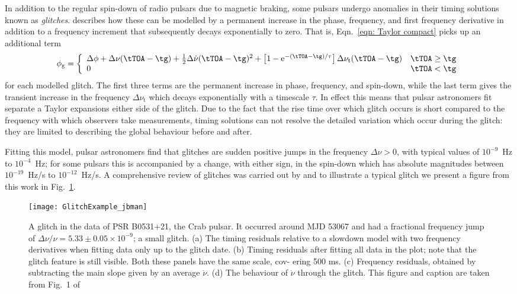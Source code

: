 In addition to the regular spin-down of radio pulsars due to magnetic braking, some
pulsars undergo anomalies in their timing solutions known as \emph{glitches}.
\citet{Edwards2006} describes how these can be modelled by a permanent increase
in the phase, frequency, and first frequency derivative in addition to a
frequency increment that subsequently decays exponentially to zero. That is,
Eqn.~\eqref{eqn: Taylor compact} picks up an additional term
\begin{align}
\phi_{\textrm{g}} = \left\{
\begin{array}{ll}
\Delta\phi + \Delta\nu(\tTOA - \tg) + \frac{1}{2}\Delta\dot{\nu}(\tTOA - \tg)^{2}
+ \left[1-\textrm{e}^{-(\tTOA - \tg)/\tau}\right]\Delta\nu_{\textrm{t}}(\tTOA - \tg)
& \tTOA \ge \tg \\
0 & \tTOA < \tg
\end{array}
\right.
\label{eqn: glitch timing model}
\end{align}
for each modelled glitch. The first three terms are the permanent increase
in phase, frequency, and spin-down, while the last term gives the transient
increase in the frequency $\Delta\nu_{\textrm{t}}$ which decays exponentially
with a timescale $\tau$. In effect this means that pulsar astronomers fit
separate a Taylor expansions either side of the glitch. Due to the fact that
the rise time over which glitch occurs is short compared to the frequency
with which observers take measurements, timing solutions can not resolve the
detailed variation which occur during the glitch: they are limited to describing
the global behaviour before and after.

Fitting this model, pulsar astronomers find that glitches are sudden positive
jumps in the frequency $\Delta\nu > 0$, with typical values of $10^{-9}$~Hz to
$10^{-4}$~Hz; for some pulsars this is accompanied by a change, with either
sign, in the spin-down which has absolute magnitudes between $10^{-19}$~Hz/s to
$10^{-12}$~Hz/s. A comprehensive review of glitches was carried out by
\citet{Espinoza2011} and to illustrate a typical glitch we present a figure
from this work in Fig.~\ref{fig: glitch}.
\begin{figure}[htb]
    \centering
    \texttt{[image: GlitchExample\_jbman]}
    \caption{
A glitch in the data of PSR B0531+21, the Crab pulsar. It occurred around MJD
53067 and had a fractional frequency jump of $\Delta\nu/\nu = 5.33 \pm 0.05
\times 10^{−9}$; a small glitch. (a) The timing residuals relative to a
slowdown model with two frequency derivatives when fitting data only up to the
glitch date. (b) Timing residuals after fitting all data in the plot; note
that the glitch feature is still visible. Both these panels have the same
scale, cov- ering 500 ms. (c) Frequency residuals, obtained by subtracting the
main slope given by an average $\dot\nu$.  (d) The behaviour of $\dot\nu$
through the glitch. This figure and caption are taken from Fig.~1 of
\citet{Espinoza2011}}
    \label{fig: glitch}
\end{figure}


